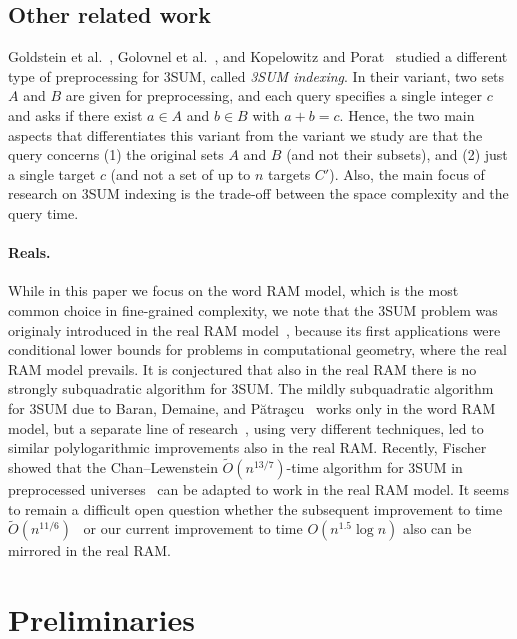 \documentclass{theoretics}
\newcommand{\Ot}{\widetilde{O}}
\begin{document}
\subsection{Other related work}

Goldstein et al.~\cite{GoldsteinKLP17}, Golovnel et al.~\cite{GolovnevGHPV20}, and Kopelowitz and Porat~\cite{KopelowitzP19} studied a different type of preprocessing for 3SUM, called \emph{3SUM indexing}. In their variant, two sets $A$ and $B$ are given for preprocessing, and each query specifies a single integer $c$ and asks if there exist $a \in A$ and $b \in B$ with $a+b=c$. 
Hence, the two main aspects that differentiates this variant from the variant we study are that the query concerns (1) the original sets $A$ and $B$ (and not their subsets), and (2) just a single target $c$ (and not a set of up to $n$ targets $C'$). Also, the main focus of research on 3SUM indexing is the trade-off between the space complexity and the query time.

\paragraph{Reals.}

While in this paper we focus on the word RAM model, which is the most common choice in fine-grained complexity, we note that the 3SUM problem was originaly introduced in the real RAM model~\cite{GajentaanO95}, because its first applications were conditional lower bounds for problems in computational geometry, where the real RAM model prevails. It is conjectured that also in the real RAM there is no strongly subquadratic algorithm for 3SUM. The mildly subquadratic algorithm for 3SUM due to Baran, Demaine, and P{\u{a}}tra{\c{s}}cu~\cite{BaranDP08} works only in the word RAM model, but a separate line of research~\cite{GronlundP18,Chan20}, using very different techniques, led to similar polylogarithmic improvements also in the real RAM. Recently, Fischer~\cite{Fischer25} showed that the Chan--Lewenstein $\Ot(n^{13/7})$-time algorithm for 3SUM in preprocessed universes~\cite{ChanL15} can be adapted to work in the real RAM model. It seems to remain a difficult open question whether the subsequent improvement to time $\Ot(n^{11/6})$~\cite{ChanWX23} or our current improvement to time $O(n^{1.5} \log n)$ also can be mirrored in the real RAM.

\section{Preliminaries}
\end{document}

